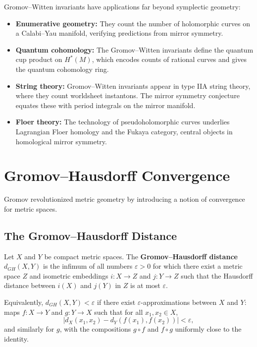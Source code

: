 Gromov--Witten invariants have applications far beyond symplectic geometry:
\begin{itemize}
    \item \textbf{Enumerative geometry:} They count the number of holomorphic curves on a Calabi--Yau manifold, verifying predictions from mirror symmetry.
    \item \textbf{Quantum cohomology:} The Gromov--Witten invariants define the quantum cup product on \(H^*(M)\), which encodes counts of rational curves and gives the quantum cohomology ring.
    \item \textbf{String theory:} Gromov--Witten invariants appear in type IIA string theory, where they count worldsheet instantons. The mirror symmetry conjecture equates these with period integrals on the mirror manifold.
    \item \textbf{Floer theory:} The technology of pseudoholomorphic curves underlies Lagrangian Floer homology and the Fukaya category, central objects in homological mirror symmetry.
\end{itemize}

\section{Gromov--Hausdorff Convergence}

Gromov revolutionized metric geometry by introducing a notion of convergence for metric spaces.

\subsection{The Gromov--Hausdorff Distance}

\begin{definition}
Let \(X\) and \(Y\) be compact metric spaces. The \textbf{Gromov--Hausdorff distance} \(d_{GH}(X, Y)\) is the infimum of all numbers \(\varepsilon > 0\) for which there exist a metric space \(Z\) and isometric embeddings \(i: X \to Z\) and \(j: Y \to Z\) such that the Hausdorff distance between \(i(X)\) and \(j(Y)\) in \(Z\) is at most \(\varepsilon\).
\end{definition}

Equivalently, \(d_{GH}(X, Y) < \varepsilon\) if there exist \(\varepsilon\)-approximations between \(X\) and \(Y\): maps \(f: X \to Y\) and \(g: Y \to X\) such that for all \(x_1, x_2 \in X\),
\[
|d_X(x_1, x_2) - d_Y(f(x_1), f(x_2))| < \varepsilon,
\]
and similarly for \(g\), with the compositions \(g \circ f\) and \(f \circ g\) uniformly close to the identity.

